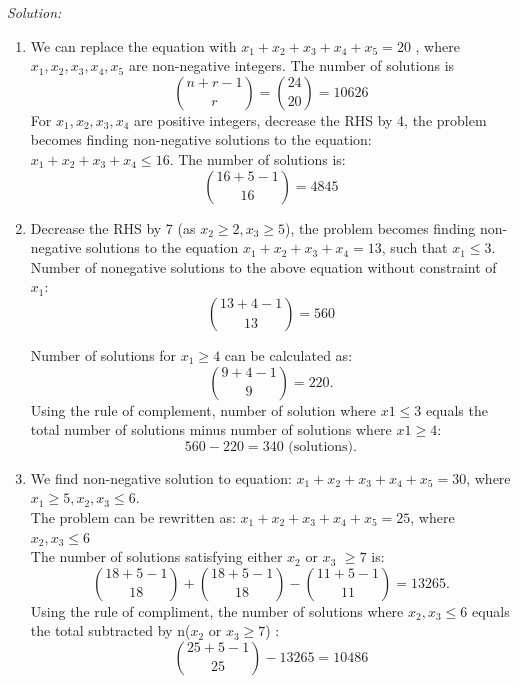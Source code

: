 \documentclass[a4paper]{article}
\begin{document}
\textit{Solution:}
\begin{enumerate}
	\item We can replace the equation with $x_1 + x_2 + x_3 + x_4 + x_5 = 20$ , where $x_1, x_2, x_3, x_4, x_5$ are non-negative integers. The number of solutions is
	      \begin{equation*}
		      {n+r-1 \choose r}  = {24 \choose 20} = 10626
	      \end{equation*}
	      For $x_1, x_2, x_3, x_4$ are positive integers, decrease the RHS by 4, the problem becomes finding non-negative solutions to the equation: $x_1 + x_2 + x_3 + x_4 \leq 16$. The number of solutions is:
	      \begin{equation*}
		      {16+5-1 \choose 16} = 4845
	      \end{equation*}
	\item Decrease the RHS by 7 (as $x_2 \geq 2, x_3 \geq 5$), the problem becomes finding non-negative solutions to the equation $x_1 + x_2 + x_3 + x_4 = 13$, such that $x_1 \leq 3$.\\
	      Number of nonegative solutions to the above equation without constraint of $x_1$:
	      \begin{equation*}
		      {13+4-1 \choose 13} = 560
	      \end{equation*}
	      
	      Number of solutions for $x_1 \geq 4$ can be calculated as:
	      \begin{equation*}
		      {9+4-1 \choose 9} = 220.
	      \end{equation*}
	      Using the rule of complement, number of solution where $x1 \leq 3$ equals the total number of solutions minus number of solutions where $x1 \geq 4$:
	      \begin{equation*}
		      560  - 220 = 340 \text{ (solutions).}
	      \end{equation*}
	\item We find non-negative solution to equation: $x_1 + x_2 + x_3 + x_4 + x_5 = 30$, where $x_1 \geq 5, x_2, x_3 \leq 6$.\\
	      The problem can be rewritten as: $x_1 + x_2 + x_3 + x_4 + x_5 = 25$, where $ x_2, x_3 \leq 6$\\
	      The number of solutions satisfying either $x_2$ or $x_3$ $\geq 7$ is: 
	      \begin{equation*}
		      {18+5-1 \choose 18} + {18 + 5 -1 \choose 18} - {11+5-1 \choose 11} = 13265.
	      \end{equation*}
	      Using the rule of compliment, the number of solutions where $x_2, x_3 \leq 6$ equals the total subtracted by n($x_2$ or $x_3 \geq 7$) :
	      \begin{equation*}
		      {25+5-1 \choose 25} - 13265 = 10486
	      \end{equation*}
\end{enumerate}
\end{document}
